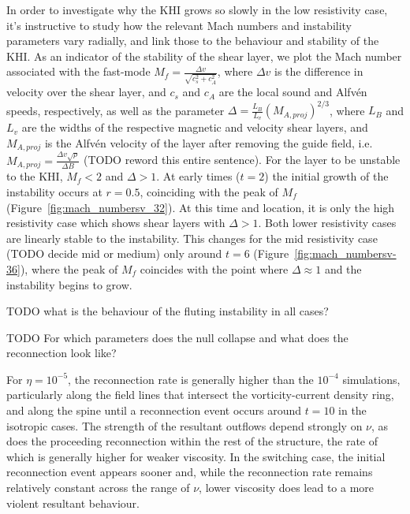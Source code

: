 In order to investigate why the KHI grows so slowly in the low resistivity case, it's instructive to study how the relevant Mach numbers and instability parameters vary radially, and link those to the behaviour and stability of the KHI. As an indicator of the stability of the shear layer, we plot the Mach number associated with the fast-mode $M_f = \frac{\Delta v}{\sqrt{c_s^2 + c_A^2}}$, where $\Delta v$ is the difference in velocity over the shear layer, and $c_s$ and $c_A$ are the local sound and Alfv\'en speeds, respectively, as well as the parameter $\Delta = \frac{L_B}{L_v}(M_{A, proj})^{2/3}$, where $L_B$ and $L_v$ are the widths of the respective magnetic and velocity shear layers, and $M_{A, proj}$ is the Alfv\'en velocity of the layer after removing the guide field, i.e. $M_{A, proj} = \frac{\Delta v \sqrt{\rho}}{\Delta B}$ (TODO reword this entire sentence). For the layer to be unstable to the KHI, $M_f < 2$ and $\Delta > 1$. At early times ($t=2$) the initial growth of the instability occurs at $r=0.5$, coinciding with the peak of $M_f$ (Figure~\ref{fig:mach_numbersv_32}). At this time and location, it is only the high resistivity case which shows shear layers with $\Delta > 1$. Both lower resistivity cases are linearly stable to the instability. This changes for the mid resistivity case (TODO decide mid or medium) only around $t=6$ (Figure~\ref{fig:mach_numbersv-36}), where the peak of $M_f$ coincides with the point where $\Delta \approx 1$ and the instability begins to grow.

TODO what is the behaviour of the fluting instability in all cases?

TODO For which parameters does the null collapse and what does the reconnection look like?

For $\eta=10^{-5}$, the reconnection rate is generally higher than the $10^{-4}$ simulations, particularly along the field lines that intersect the vorticity-current density ring, and along the spine until a reconnection event occurs around $t=10$ in the isotropic cases. The strength of the resultant outflows depend strongly on $\nu$, as does the proceeding reconnection within the rest of the structure, the rate of which is generally higher for weaker viscosity. In the switching case, the initial reconnection event appears sooner and, while the reconnection rate remains relatively constant across the range of $\nu$, lower viscosity does lead to a more violent resultant behaviour.
